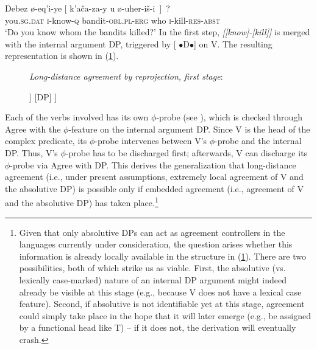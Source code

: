 \documentclass[output=paper
,modfonts
,nonflat]{langsci/langscibook}
\begin{document}
	\ea\label{ex:mueller:31}  \label{cp3d}
	\gll  Debez \o -eq'i-ye [ k'a\v{c}a\textgamma -za-y \textbeltl u \o -uher-i\v{s}-\textbeltl i~]~? \\
	you.{\scshape sg.dat} {\scshape i}-know-{\scshape q} {} bandit-{\scshape obl.pl-erg}   who {\scshape i}-kill-{\scshape res-abst} \\ 
	\glt `Do you know whom the bandits killed?'
	\z
	In the first step, {\itshape [[know]-[kill]]} is merged
	with  the internal argument DP, triggered by  [{\small
		$\bullet$}D{\small $\bullet$}] on V. The resulting
	representation is shown in (\ref{Baum}).
	\begin{figure}[!h]
	\begin{exe}
		\ex	\label{ex:mueller:32} {\textit{Long-distance agreement by reprojection, first stage}\label{Baum}}:\\
			\begin{forest}	
				[VP
				[V\sub{2}
				[V\sub{1{,}{[}$\bullet$C$\bullet${]}{,}{[}$\ast$$\phi$$\ast${]}{,}{[}\textit{$\ast$inf--st$\ast$}{]}} ]
				[V\sub{2{,}\underline{{[}$\ast$$\phi$$\ast${]}}}] ]
				[DP]
				] 	
		\end{forest}
	\end{exe} \vspace{-0.8cm}
\end{figure}
\newpage \noindent	Each of the verbs involved has its own $\phi$-probe
	(see \citealt{BejarRezac:09}), which is checked through Agree with the
	$\phi$-feature on the internal argument DP. Since V is the head of
	the complex predicate, its $\phi$-probe intervenes between V's
	$\phi$-probe and the internal DP.  Thus, V's $\phi$-probe has to be
	discharged first; afterwards, V can discharge its  $\phi$-probe via
	Agree with DP. This
	derives the generalization that long-distance agreement (i.e., under
	present assumptions, extremely local agreement of V and the absolutive DP)
	is possible only if embedded agreement (i.e., agreement of V and the
	absolutive DP) has taken place.\footnote{Given that only absolutive
		DPs can act as agreement controllers in the languages currently
		under consideration, the question arises whether this information is
		already locally available in the structure in (\ref{Baum}). There are
		two possibilities, both of which strike us as viable. First, the
		absolutive (vs. lexically case-marked) nature of an internal DP
		argument might indeed already be visible at this stage (e.g.,
		because V does not have a lexical case feature). Second, if
		absolutive is not identifiable yet at this stage, agreement could
		simply take place in the hope that it will later emerge (e.g., be
		assigned by a functional head like T) -- if it does not, the
		derivation will eventually crash.}
	
\end{document}
